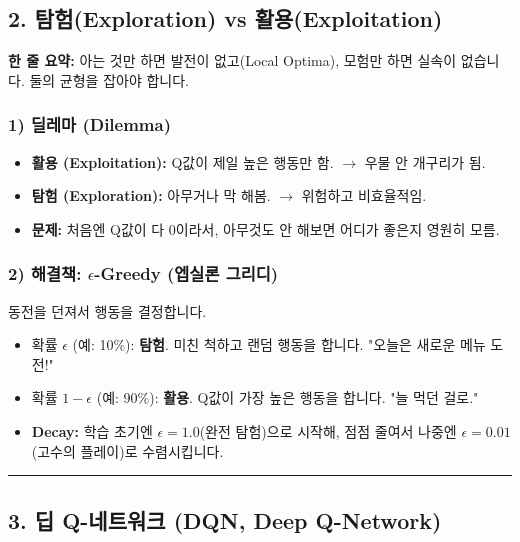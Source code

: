 \documentclass[11pt,a4paper]{book}
\theoremstyle{definition}
\begin{document}
\subsection{2. 탐험(Exploration) vs 활용(Exploitation)}

\begin{conceptbox}[title={개념 2: 단골집 vs 신상 맛집}]
\textbf{한 줄 요약:} 아는 것만 하면 발전이 없고(Local Optima), 모험만 하면 실속이 없습니다. 둘의 균형을 잡아야 합니다.
\end{conceptbox}

\subsubsection*{1) 딜레마 (Dilemma)}
\begin{itemize}
    \item \textbf{활용 (Exploitation):} Q값이 제일 높은 행동만 함. $\rightarrow$ 우물 안 개구리가 됨.
    \item \textbf{탐험 (Exploration):} 아무거나 막 해봄. $\rightarrow$ 위험하고 비효율적임.
    \item \textbf{문제:} 처음엔 Q값이 다 0이라서, 아무것도 안 해보면 어디가 좋은지 영원히 모름.
\end{itemize}

\subsubsection*{2) 해결책: $\epsilon$-Greedy (엡실론 그리디)}
동전을 던져서 행동을 결정합니다.
\begin{itemize}
    \item 확률 $\epsilon$ (예: 10\%): \textbf{탐험}. 미친 척하고 랜덤 행동을 합니다. "오늘은 새로운 메뉴 도전!"
    \item 확률 $1-\epsilon$ (예: 90\%): \textbf{활용}. Q값이 가장 높은 행동을 합니다. "늘 먹던 걸로."
    \item \textbf{Decay:} 학습 초기엔 $\epsilon=1.0$(완전 탐험)으로 시작해, 점점 줄여서 나중엔 $\epsilon=0.01$(고수의 플레이)로 수렴시킵니다.
\end{itemize}

\vspace{0.5cm}\hrule\vspace{0.5cm}

\subsection{3. 딥 Q-네트워크 (DQN, Deep Q-Network)}
\end{document}
